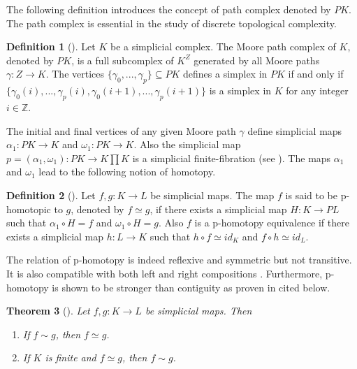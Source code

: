 \documentclass[preprint,11pt %
]{hjm1}
\newtheorem{theorem}{Theorem}[section]
\theoremstyle{definition}
\newtheorem{definition}[theorem]{Definition}
\begin{document}
The following definition introduces the concept of path complex denoted by $PK$. %
The path complex is essential in the study of discrete topological complexity.


\begin{definition}[\cite{sim}]
Let $K$ be a simplicial complex. The Moore path complex of $K$, denoted by $PK$, is a full subcomplex of $K^Z$ generated by all Moore paths $\gamma : Z \to K$. The vertices $\lbrace \gamma _0,...,\gamma _p \rbrace \subseteq PK $ defines a simplex in $PK$ if and only if 
$
\lbrace \gamma _0 (i),...,\gamma _p(i),\gamma _0(i+1),...,\gamma _p(i+1) \rbrace
$
is a simplex in $K$ for any integer $i\in \mathbb{Z}$.
\end{definition}

The initial and ﬁnal vertices of any given Moore path $\gamma$ deﬁne simplicial maps $\alpha_1 : PK\to K$ and $\omega_1 : PK \to K$.
Also the simplicial map 
$
p = (\alpha_1 , \omega_1 ):PK\to K\prod  K
$
is a simplicial ﬁnite-ﬁbration (see \cite{sim}).
 The maps $\alpha_1$ and $\omega_1$ lead to the following notion of homotopy.

\begin{definition}[\cite{sim}]
Let $f,g: K \to L$ be simplicial maps. The map $f$ is said to be p-homotopic to $g$, denoted by $f \simeq g$, if there exists a simplicial map $H: K \to PL$ such that $\alpha_1 \circ H = f$ and $\omega_1 \circ H = g$. 
Also $f$ is  a p-homotopy equivalence if there exists a simplicial map $h: L \to K$ such that $h \circ f\simeq id_K$ and $f \circ h \simeq id_L$. 
\end{definition}


The relation of p-homotopy is indeed reflexive and symmetric but not transitive. It is also compatible with both left and right compositions \cite{sim}. Furthermore, p-homotopy is shown to be stronger than contiguity as proven in \cite[Proposition 5.10]{sim} cited below.
\begin{theorem}[\cite{sim}]\label{5.10}
Let $f,g: K \to L$ be simplicial maps. Then 
\begin{enumerate}
\item[(i)]
If $f\sim g$, then $f\simeq g$.
\item[(ii)]
If $K$ is finite and $f\simeq g$, then $f\sim g$.
\end{enumerate}
\end{theorem}
\end{document}

